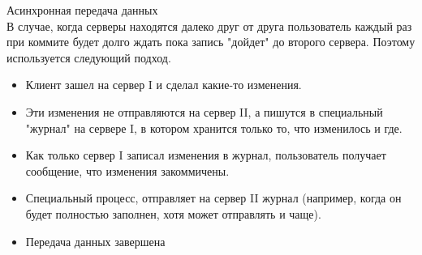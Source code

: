 Асинхронная передача данных \\
В случае, когда серверы находятся далеко друг от друга пользователь каждый раз при коммите будет долго ждать пока запись "дойдет" до второго сервера. Поэтому используется следующий подход. 
\begin {itemize}
\item Клиент зашел на сервер I и сделал какие-то изменения.
\item Эти изменения не отправляются на сервер II, а пишутся в специальный "журнал"  на сервере I, в котором хранится только то, что изменилось и где. 
\item Как только сервер I записал изменения в журнал, пользователь получает сообщение, что изменения закоммичены. 
\item Специальный процесс, отправляет на сервер II журнал (например, когда он будет полностью заполнен, хотя может отправлять и чаще). 
\item Передача данных завершена 
\end {itemize}